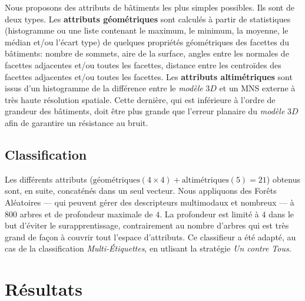 \documentclass[a4paper,french]{article}
\begin{document}
    Nous proposons des attributs de bâtiments les plus simples possibles. Ils sont de deux types. Les \textbf{attributs géométriques} sont calculés à partir de statistiques (histogramme ou une liste contenant le maximum, le minimum, la moyenne, le médian et/ou l'écart type) de quelques propriétés géométriques des facettes du bâtiments: nombre de sommets, aire de la surface, angles entre les normales de facettes adjacentes et/ou toutes les facettes, distance entre les centroïdes des facettes adjacentes et/ou toutes les facettes. Les \textbf{attributs altimétriques} sont issus d'un histogramme de la différence entre le \emph{modèle} $3D$ et un MNS externe à très haute résolution spatiale. {\color{black}Cette dernière, qui est inférieure à l'ordre de grandeur des bâtiments, doit être plus grande que l'erreur planaire du \emph{modèle} $3D$ afin de garantire un résistance au bruit.}
    \subsection{Classification}

    Les différents attributs ($\text{géométriques}(4\times4) + \text{altimétriques}(5) = 21$) obtenus sont, en suite, concaténés dans un seul vecteur. Nous appliquons des Forêts Aléatoires --- qui peuvent gérer des descripteurs multimodaux et nombreux --- à $800$ arbres et de profondeur maximale de $4$. {\color{black}La profondeur est limité à $4$ dans le but d'éviter le surapprentissage, contrairement au nombre d'arbres qui est très grand de façon à couvrir tout l'espace d'attributs}. Ce classifieur a été adapté, au cas de la classification \emph{Multi-\'Etiquettes}, en utlisant la stratégie \emph{Un contre Tous}.

    \section{Résultats}
\end{document}
